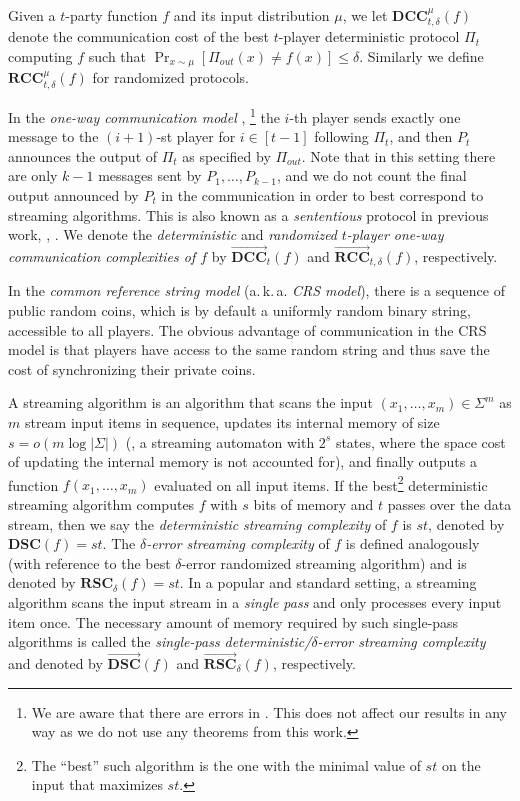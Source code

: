 \documentclass{toc}
\newcommand{\follows}{\ensuremath{\sim}}
\newcommand{\error}{\ensuremath{\delta}}
\newcommand{\littleo}[1]{\ensuremath{{o \left( {#1} \right)}}}
\newcommand{\alphabet}{\ensuremath{\Sigma}}
\newcommand{\dcc}{\ensuremath{\mathbf{DCC}}}
\newcommand{\rcc}{\ensuremath{\mathbf{RCC}}}
\newcommand{\dsc}{\ensuremath{\mathbf{DSC}}}
\newcommand{\rsc}{\ensuremath{\mathbf{RSC}}}
\newcommand{\dccone}{\ensuremath{\overrightarrow{\mathbf{DCC}}}}
\newcommand{\rccone}{\ensuremath{\overrightarrow{\mathbf{RCC}}}}
\newcommand{\dscone}{\ensuremath{\overrightarrow{\mathbf{DSC}}}}
\newcommand{\rscone}{\ensuremath{\overrightarrow{\mathbf{RSC}}}}
\begin{document}
Given a $t$-party function $f$ and its input distribution $\mu$, we let $\dcc^{\mu}_{t,\error}(f)$
denote the communication cost of the best $t$-player deterministic protocol $\Pi_t$ computing $f$ such that 
$\Pr_{x\follows \mu}\left[ \Pi_{out}(x)\ne f(x) \right] \le \error$.
Similarly we define  $\rcc^{\mu}_{t,\error}(f)$ for randomized protocols.

%
In the \emph{one-way communication model} \cite{papadimitriou1984communication,ablayev1996lower,kremer1999randomized}, \footnote{We are aware that there are errors in \cite{kremer1999randomized}. This does not affect our results in any way as we do not use any theorems from this work.}
the $i$-th player sends exactly one message to the $(i+1)$-st player for $i\in[t-1]$ following $\Pi_t$,
and then $P_t$ announces the output of $\Pi_t$ as specified by $\Pi_{out}$.
Note that in this setting there are only $k-1$ messages sent by $P_1,\dots, P_{k-1}$, and we do not count the final output announced by $P_t$ in the communication in order to best correspond to streaming algorithms.
This is also known as a \emph{sententious} protocol in previous work, \eg, \cite{Viola:2013we}.
%
We denote the \emph{deterministic} and \emph{randomized} \emph{$t$-player one-way communication complexities of $f$} by $\dccone_t(f)$ and $\rccone_{t,\error}(f)$,
%
%
 respectively.  %

In the \emph{common reference string model} (a.\,k.\,a. \emph{CRS model}), 
there is a sequence of public random coins, which is by default a uniformly random binary string, accessible to all players.
The obvious advantage of communication in the CRS model is that players 
have access to the same random string and thus 
save the cost of synchronizing their private coins.

A streaming algorithm is an algorithm that scans the input $(x_1,\dots,x_m)\in\alphabet^m$ as $m$ stream input items in sequence, updates its internal memory of size $s=\littleo{m \log|\alphabet|}$ (\ie, a streaming automaton with $2^s$ states, where the space cost of updating the internal memory is not accounted for),
and finally outputs a function $f(x_1,\dots,x_m)$ evaluated on all input items. 
If the best\footnote{{\color{black}The ``best'' such algorithm is the one with the minimal value of $st$ on the input that maximizes $st$.}}
%
%
%
%
%
%
%
deterministic streaming algorithm 
computes $f$ with $s$ bits of memory and $t$ passes over the data 
stream, then we say the \emph{deterministic}
\emph{streaming complexity} of $f$ is $st$, denoted by $\dsc(f)=st$.
The \emph{$\error$-error} \emph{streaming complexity} of $f$
is defined analogously (with reference to the best
$\error$-error randomized streaming algorithm) and is denoted
by $\rsc_\error(f)=st$.     %
%
%
In a popular and standard setting, a streaming algorithm scans the input stream in a \emph{single pass} and only processes every input item once. 
The necessary amount of memory required by such single-pass algorithms is called the \emph{single-pass deterministic/$\error$-error streaming complexity} and denoted by $\dscone(f)$ and $\rscone_\error(f)$, respectively.
%
%
\end{document}

